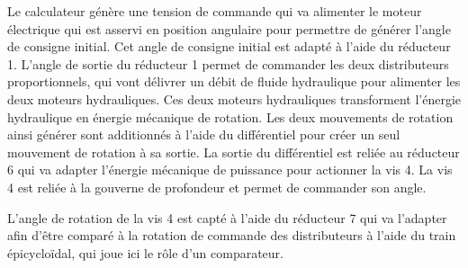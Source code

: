 \documentclass[10pt,fleqn]{article} %
\begin{document}
\begin{multicols}{2}
%
%

Le calculateur génère une tension de commande qui va alimenter le moteur électrique qui est asservi en
position angulaire pour permettre de générer l’angle de consigne initial. Cet angle de consigne initial est
adapté à l’aide du réducteur 1. L’angle de sortie du réducteur 1 permet de commander les deux
distributeurs proportionnels, qui vont délivrer un débit de fluide hydraulique pour alimenter les deux
moteurs hydrauliques. Ces deux moteurs hydrauliques transforment l’énergie hydraulique en énergie
mécanique de rotation. Les deux mouvements de rotation ainsi générer sont additionnés à l’aide du
différentiel pour créer un seul mouvement de rotation à sa sortie. La sortie du différentiel est reliée
au réducteur 6 qui va adapter l’énergie mécanique de puissance pour actionner la vis 4. La vis 4 est
reliée à la gouverne de profondeur et permet de commander son angle.

L’angle de rotation de la vis 4 est capté à l’aide du réducteur 7 qui va l’adapter afin d’être comparé à la
rotation de commande des distributeurs à l’aide du train épicycloïdal, qui joue ici le rôle d’un
comparateur.


%
%
%


\end{multicols}
\end{document}
